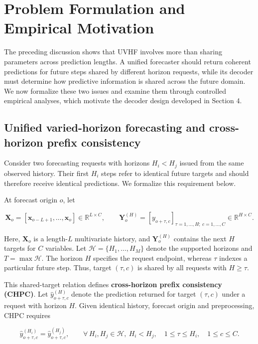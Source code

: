 \section{Problem Formulation and Empirical Motivation}
\label{sec:problem-formulation}


The preceding discussion shows that UVHF involves more than sharing parameters across prediction lengths. A unified forecaster should return coherent predictions for future steps shared by different horizon requests, while its decoder must determine how predictive information is shared across the future domain. We now formalize these two issues and examine them through controlled empirical analyses, which motivate the decoder design developed in Section 4.

\subsection{Unified varied-horizon forecasting and cross-horizon prefix consistency}


Consider two forecasting requests with horizons $H_i<H_j$ issued from the same observed history. Their first $H_i$ steps refer to identical future targets and should therefore receive identical predictions. We formalize this requirement below.

At forecast origin $o$, let

\[
\mathbf X_o
=
\left[\mathbf x_{o-L+1},\ldots,\mathbf x_o\right]
\in\mathbb R^{L\times C},
\qquad
\mathbf Y_o^{(H)}
=
\left[y_{o+\tau,c}\right]_{\tau=1,\ldots,H;\ c=1,\ldots,C}
\in\mathbb R^{H\times C}.
\]


Here, $\mathbf X_o$ is a length-$L$ multivariate history, and $\mathbf Y_o^{(H)}$ contains the next $H$ targets for $C$ variables. Let $\mathcal H=\{H_1,\ldots,H_M\}$ denote the supported horizons and $T=\max\mathcal H$. The horizon $H$ specifies the request endpoint, whereas $\tau$ indexes a particular future step. Thus, target $(\tau,c)$ is shared by all requests with $H\geq\tau$.

This shared-target relation defines \textbf{cross-horizon prefix consistency (CHPC)}. Let $\widehat y_{o+\tau,c}^{(H)}$ denote the prediction returned for target $(\tau,c)$ under a request with horizon $H$. Given identical history, forecast origin and preprocessing, CHPC requires

\[
\widehat y_{o+\tau,c}^{(H_i)}
=
\widehat y_{o+\tau,c}^{(H_j)},
\qquad
\forall\,H_i,H_j\in\mathcal H,\ H_i<H_j,\quad
1\leq\tau\leq H_i,\quad
1\leq c\leq C.
\]


